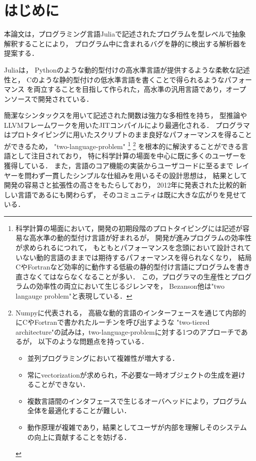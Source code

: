 
\section{はじめに}

本論文は，プログラミング言語Juliaで記述されたプログラムを型レベルで抽象解釈することにより，
プログラム中に含まれるバグを静的に検出する解析器を提案する．

Julia\cite{julia}は，
Pythonのような動的型付けの高水準言語が提供するような柔軟な記述性と，
Cのような静的型付けの低水準言語を書くことで得られるようなパフォーマンス
を両立することを目指して作られた，高水準の汎用言語であり，オープンソースで開発されている．

簡潔なシンタックスを用いて記述された関数は強力な多相性を持ち，
型推論やLLVMフレームワークを用いたJITコンパイルにより最適化される．
プログラマはプロトタイピングに用いたスクリプトのまま良好なパフォーマンスを得ることができるため，
"two-language-problem"
\footnote{
  科学計算の場面において，開発の初期段階のプロトタイピングには記述が容易な高水準の動的型付け言語が好まれるが，
  開発が進みプログラムの効率性が求められるにつれて，
  もともとパフォーマンスを念頭において設計されていない動的言語のままでは期待するパフォーマンスを得られなくなり，
  結局CやFortranなど効率的に動作する低級の静的型付け言語にプログラムを書き直さなくてはならなくなることが多い．
  この，プログラマの生産性とプログラムの効率性の両立において生じるジレンマを，
  Bezanson他は"two langauge problem"\cite{julia-2012, Julia-2017}と表現している．
}
\footnote{
  Numpy\cite{numpy}に代表される，
  高級な動的言語のインターフェースを通じて内部的にCやFortranで書かれたルーチンを呼び出すような
  "two-tiered architecture"の試みは，two-language-problemに対する1つのアプローチであるが，
  以下のような問題点を持っている\cite{julia-2012}．
  \begin{itemize}
    \item 並列プログラミングにおいて複雑性が増大する．
    \item 常にvectorizationが求められ，不必要な一時オブジェクトの生成を避けることができない．
    \item 複数言語間のインタフェースで生じるオーバヘッドにより，プログラム全体を最適化することが難しい．
    \item 動作原理が複雑であり，結果としてユーザが内部を理解しそのシステムの向上に貢献することを妨げる．
  \end{itemize}
}
を根本的に解決することができる言語として注目されており，
特に科学計算の場面を中心に既に多くのユーザーを獲得している\cite{julia-growth}．
また，言語のコア機能の実装からユーザコードに至るまで
レイヤーを問わず一貫したシンプルな仕組みを用いるその設計思想は，
結果として開発の容易さと拡張性の高さをもたらしており\cite{julia-2012}，
2012年に発表された比較的新しい言語であるにも関わらず，
そのコミュニティは既に大きな広がりを見せている．

